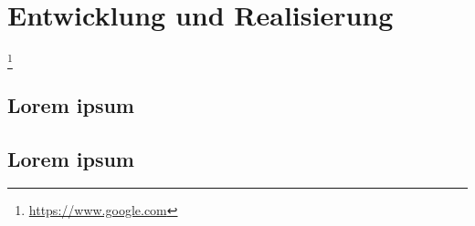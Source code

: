 \section{Entwicklung und Realisierung}\label{sec:S4}
\lipsum[1-2] \footnote{\url{https://www.google.com}}

\subsection{Lorem ipsum}
\lipsum[1-4]

\subsection{Lorem ipsum}
\lipsum[1-4]
\newpage